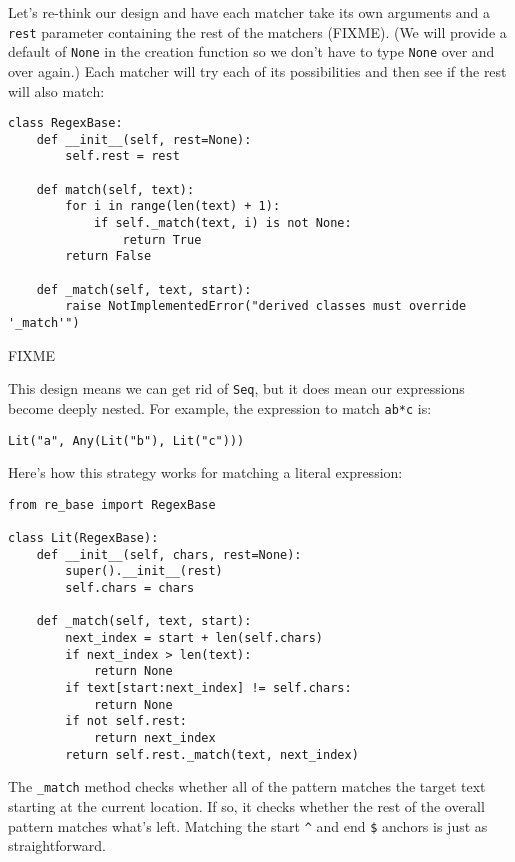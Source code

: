 \documentclass{scrbook}
\begin{document}
Let's re-think our design
and have each matcher take its own arguments and a \texttt{rest} parameter containing the rest of the matchers
(FIXME).
(We will provide a default of \texttt{None} in the creation function
so we don't have to type \texttt{None} over and over again.)
Each matcher will try each of its possibilities and then see if the rest will also match:


\begin{lstlisting}[frame=single,frameround=tttt]
class RegexBase:
    def __init__(self, rest=None):
        self.rest = rest

    def match(self, text):
        for i in range(len(text) + 1):
            if self._match(text, i) is not None:
                return True
        return False

    def _match(self, text, start):
        raise NotImplementedError("derived classes must override '_match'")
\end{lstlisting}



FIXME


This design means we can get rid of \texttt{Seq},
but it does mean our expressions become deeply nested.
For example, the expression to match \texttt{ab*c} is:

\begin{lstlisting}[frame=single,frameround=tttt]
Lit("a", Any(Lit("b"), Lit("c")))
\end{lstlisting}


Here's how this strategy works for matching a literal expression:


\begin{lstlisting}[frame=single,frameround=tttt]
from re_base import RegexBase

class Lit(RegexBase):
    def __init__(self, chars, rest=None):
        super().__init__(rest)
        self.chars = chars

    def _match(self, text, start):
        next_index = start + len(self.chars)
        if next_index > len(text):
            return None
        if text[start:next_index] != self.chars:
            return None
        if not self.rest:
            return next_index
        return self.rest._match(text, next_index)
\end{lstlisting}



The \texttt{\_match} method checks whether all of the pattern matches the target text
starting at the current location.
If so,
it checks whether the rest of the overall pattern matches what's left.
Matching the start \texttt{{\textasciicircum}} and end \texttt{\$} anchors is just as straightforward.
\end{document}
